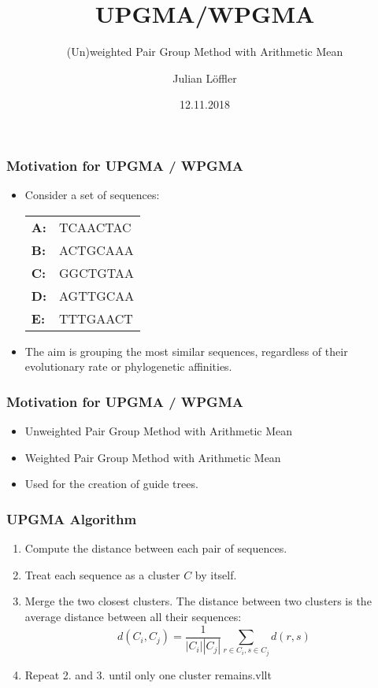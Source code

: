 \documentclass[usenames,dvipsnames,xcolor=table]{beamer}
\begin{document}
\title{UPGMA/WPGMA}
\subtitle{(Un)weighted \textcolor{ALUblue}{P}air \textcolor{ALUblue}{G}roup \textcolor{ALUblue}{M}ethod with \textcolor{ALUblue}{A}rithmetic Mean}
\author{Julian L\"offler}
\date{12.11.2018}
\frame{\titlepage}

\begin{frame}[fragile]
  \frametitle{Motivation for UPGMA / WPGMA}
  \begin{itemize}
    \item Consider a set of sequences:
    \begin{table}[]
      \begin{tabular}{ll}
        \textbf{A:} & TCAACTAC \\
        \textbf{B:} & ACTGCAAA \\
        \textbf{C:} & GGCTGTAA \\
        \textbf{D:} & AGTTGCAA \\
        \textbf{E:} & TTTGAACT
      \end{tabular}
    \end{table}
    \item The aim is \textcolor{ALUblue}{grouping} the most \textcolor{ALUblue}{similar sequences}, regardless of their evolutionary rate or phylogenetic affinities.
  \end{itemize}
\end{frame}

\begin{frame}[fragile]
  \frametitle{Motivation for UPGMA / WPGMA}
  \begin{itemize}
    \item \textcolor{ALUblue}{U}nweighted \textcolor{ALUblue}{P}air \textcolor{ALUblue}{G}roup \textcolor{ALUblue}{M}ethod with \textcolor{ALUblue}{A}rithmetic Mean
    \item \textcolor{ALUblue}{W}eighted \textcolor{ALUblue}{P}air \textcolor{ALUblue}{G}roup \textcolor{ALUblue}{M}ethod with \textcolor{ALUblue}{A}rithmetic Mean
    \item Used for the \textcolor{ALUblue}{creation of guide trees}.
  \end{itemize}
\end{frame}


\begin{frame}[fragile]
  \frametitle{UPGMA Algorithm}
  \begin{enumerate}
    \item Compute the \textcolor{ALUblue}{distance between each pair of sequences}.
    \item Treat \textcolor{ALUblue}{each sequence} as a \textcolor{ALUblue}{cluster $C$} by itself.
    \item \textcolor{ALUblue}{Merge the two closest clusters}. The distance between two clusters is the \textcolor{ALUred}{average distance between all their sequences}:
    $$d(C_i,C_j) = \frac{1}{|C_i| |C_j|} \sum_{r \in C_i, s\in C_j} d(r,s)$$
    \item Repeat 2. and 3. until only one cluster remains.vllt
  \end{enumerate}
\end{frame}
\end{document}
